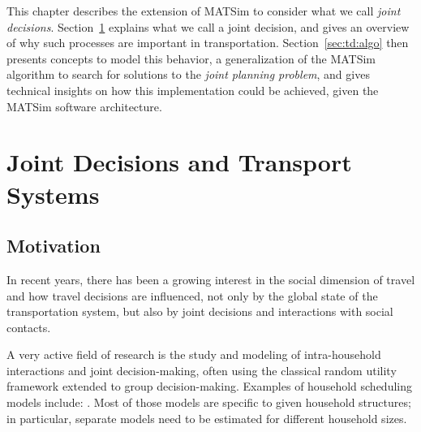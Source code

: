 { %
\newcommand\insfig[2]{%
	\insfigwidth{#1}{#2}{.8\textwidth}
}
\newcommand\insfigwidth[3]{%
\createfigure{#1}{#1}{}{%
		\texttt{[image: extending/figures/Jointtrips/\#2]}%
		}{}%
}

\newcommand\inssubfigwidth[3]{%
\createsubfigure{#2}{%
		\texttt{[image: extending/figures/Jointtrips/\#3]}%
		}{}{\quad}%
}
\newcommand\inssubfig[2]{%
\inssubfigwidth{.46\textwidth}{#1}{#2}%
}
\newcommand\insfigwithsubfigs[2]{%
\createfigure{#1}{#1}{}{%
		#2%
		}{}%
}

This chapter describes the extension of MATSim to consider what we call \emph{joint decisions}. Section~\ref{sec:td:intro} explains what we call a joint decision, and gives an overview of why such processes
are important in transportation. Section~\ref{sec:td:algo} then presents concepts to model this behavior, a generalization of the MATSim algorithm to search for solutions to the \emph{joint planning problem}, and gives technical insights on how this implementation could be achieved, given the MATSim software architecture.

\section{Joint Decisions and Transport Systems}
\label{sec:td:intro}
\subsection{Motivation}
In recent years, there has been a growing interest in the social dimension of travel and how travel decisions are influenced, not only by the global state of the transportation system, but also by joint decisions and interactions with social contacts.

A very active field of research is the study and modeling of intra-household interactions and joint decision-making, often using the classical random utility framework extended to group decision-making. Examples of household scheduling models include: \citet{ZhangEtAl_TransResB_2005, ZhangJEtAl_TRR_2007, KatoMatsumoto_TransResB_2009, BradleyVovsha_Transportation_2005, GliebeKoppelman_Transportation_2005,
GliebeKoppelman_Transportation_2002, HoCAndMulley_Transportation_2013, VovshaGupta_Transportation_2013}. Most of those models are specific to given household structures; in particular, separate models need to be estimated for different household sizes.

}
